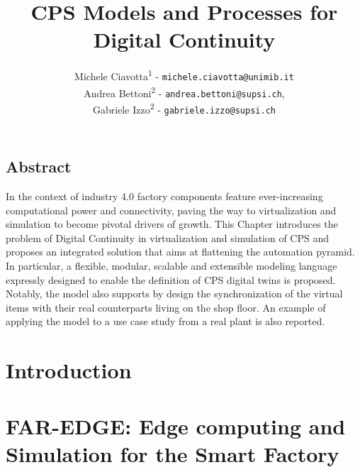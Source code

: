 \documentclass{riverk}
\begin{document}
\setcounter{article}{7}

\begin{opening}
\title[CPS Models and Processes for Digital Simulation]{CPS Models and Processes for Digital Continuity %
            }
\author{Michele Ciavotta\textsuperscript{1} - \texttt{michele.ciavotta@unimib.it}\\
        Andrea Bettoni\textsuperscript{2} - \texttt{andrea.bettoni@supsi.ch},\\
	    Gabriele Izzo\textsuperscript{2} - \texttt{gabriele.izzo@supsi.ch}}
\end{opening}

\subsection*{Abstract}

In the context of industry 4.0 factory components feature ever-increasing computational power and connectivity, paving the way to virtualization and simulation to become pivotal drivers of growth. This Chapter introduces the problem of Digital Continuity in virtualization and simulation of CPS and proposes an integrated solution that aims at flattening the automation pyramid. In particular, a flexible, modular, scalable and extensible modeling language expressly designed to enable the definition of CPS digital twins is proposed. Notably, the model also supports by design the synchronization of the virtual items with their real counterparts living on the shop floor. 
An example of applying the model to a use case study from a real plant is also reported. 


\section{Introduction} 


\section{FAR-EDGE: Edge computing and Simulation for the Smart Factory}\label{sec:project}

\end{document}
